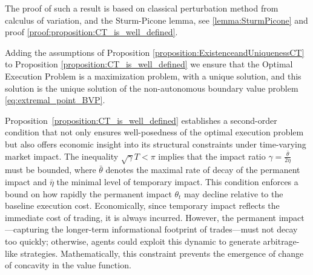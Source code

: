 \documentclass[final,3p,authoryear,12pt]{elsarticle}
\newtheorem{remark}{Remark}
\begin{document}
The proof of such a result is based on classical perturbation method from calculus of variation, and the Sturm-Picone lemma, see \ref{lemma:SturmPicone} and proof \ref{proof:proposition:CT_is_well_defined}. 

    Adding the assumptions of Proposition \ref{proposition:ExistenceandUniquenessCT} to Proposition \ref{proposition:CT_is_well_defined} we ensure that the Optimal Execution Problem is a maximization problem, with a unique solution, and this solution is the unique solution of the non-autonomous boundary value problem \eqref{eq:extremal_point_BVP}.

\medskip 
Proposition~\ref{proposition:CT_is_well_defined} establishes a second-order condition that not only ensures well-posedness of the optimal execution problem but also offers economic insight into its structural constraints under time-varying market impact. The inequality \(\sqrt{\gamma}T < \pi\) implies that the impact ratio \(\gamma = \frac{\bar{\theta}}{2\bar{\eta}}\) must be bounded, where \(\bar{\theta}\) denotes the maximal rate of decay of the permanent impact and \(\bar{\eta}\) the minimal level of temporary impact. 
This condition enforces a bound on how rapidly the permanent impact \(\theta_t\) may decline relative to the baseline execution cost. Economically, since temporary impact reflects the immediate cost of trading, it is always incurred. However, the permanent impact—capturing the longer-term informational footprint of trades—must not decay too quickly; otherwise, agents could exploit this dynamic to generate arbitrage-like strategies. Mathematically, this constraint prevents the emergence of change of concavity in the value function.
\end{document}
